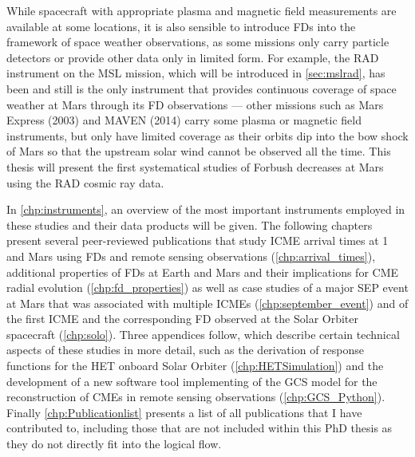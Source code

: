 While spacecraft with appropriate plasma and magnetic field measurements are available at some locations, it is also sensible to introduce \acp{FD} into the framework of space weather observations, as some missions only carry particle detectors or provide other data only in limited form. For example, the \ac{RAD} instrument on the \ac{MSL} mission, which will be introduced in \autoref{sec:mslrad}, has been and still is the only instrument that provides continuous coverage of space weather at Mars through its \ac{FD} observations --- other missions such as Mars Express (2003) and MAVEN (2014) carry some plasma or magnetic field instruments, but only have limited coverage as their orbits dip into the bow shock of Mars so that the upstream solar wind cannot be observed all the time. This thesis will present the first systematical studies of Forbush decreases at Mars using the \ac{RAD} cosmic ray data.

In \autoref{chp:instruments}, an overview of the most important instruments employed in these studies and their data products will be given. The following chapters present several peer-reviewed publications that study \ac{ICME} arrival times at \SI{1}{\AU} and Mars using \acp{FD} and remote sensing observations (\autoref{chp:arrival_times}), additional properties of \acp{FD} at Earth and Mars and their implications for \ac{CME} radial evolution (\autoref{chp:fd_properties}) as well as case studies of a major \ac{SEP} event at Mars that was associated with multiple \acp{ICME} (\autoref{chp:september_event}) and of the first \ac{ICME} and the corresponding \ac{FD} observed at the Solar Orbiter spacecraft (\autoref{chp:solo}). Three appendices follow, which describe certain technical aspects of these studies in more detail, such as the derivation of response functions for the \ac{HET} onboard Solar Orbiter (\autoref{chp:HETSimulation}) and the development of a new software tool implementing of the \ac{GCS} model for the reconstruction of \acp{CME} in remote sensing observations (\autoref{chp:GCS_Python}). Finally \autoref{chp:Publicationlist} presents a list of all publications that I have contributed to, including those that are not included within this PhD thesis as they do not directly fit into the logical flow.
